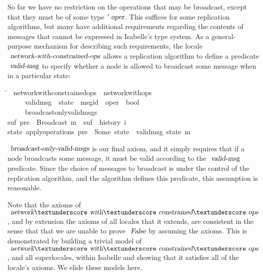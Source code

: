 So far we have no restriction on the operations that may be broadcast, except that they must be of some type $\isacharprime\isa{oper}$.
This suffices for some replication algorithms, but many have additional requirements regarding the contents of messages that cannot be expressed in Isabelle's type system.
As a general-purpose mechanism for describing such requirements, the locale $\isa{network-with-constrained-ops}$ allows a replication algorithm to define a predicate $\isa{valid-msg}$ to specify whether a node is allowed to broadcast some message when in a particular state:
\begin{isabelle}
\hspace{6em}\=\kill
{}\ network{\isacharunderscore}with{\isacharunderscore}constrained{\isacharunderscore}ops\ {\isacharequal}\ network{\isacharunderscore}with{\isacharunderscore}ops\ {\isacharplus}\\
~~~~\ valid{\isacharunderscore}msg\ {\isacharcolon}{\isacharcolon}\ {\isachardoublequoteopen}{\isacharprime}state\ {\isasymRightarrow}\ {\isacharparenleft}{\isacharprime}msgid\ {\isasymtimes}\ {\isacharprime}oper{\isacharparenright}\ {\isasymRightarrow}\ bool{\isachardoublequoteclose}\\
~~~~\ broadcast{\isacharunderscore}only{\isacharunderscore}valid{\isacharunderscore}msgs{\isacharcolon}\\
\>{\isachardoublequoteopen}{\isasymexists}suf{\isachardot}\ pre\ {\isacharat}\ {\isacharbrackleft}Broadcast\ m{\isacharbrackright}\ {\isacharat}\ suf\ {\isacharequal}\ history\ i\ {\isasymLongrightarrow}\\
\>{\isasymexists}state{\isachardot}\ apply{\isacharunderscore}operations\ pre\ {\isacharequal}\ Some\ state\ {\isasymand}\ valid{\isacharunderscore}msg\ state\ m{\isachardoublequoteclose}
\end{isabelle}

$\isa{broadcast-only-valid-msgs}$ is our final axiom, and it simply requires that if a node broadcasts some message, it must be valid according to the $\isa{valid-msg}$ predicate.
Since the choice of messages to broadcast is under the control of the replication algorithm, and the algorithm defines this predicate, this assumption is reasonable.

Note that the axioms of $\isa{network}{\isacharunderscore}\isa{with}{\isacharunderscore}\isa{constrained}{\isacharunderscore}\isa{ops}$, and by extension the axioms of all locales that it extends, are consistent in the sense that that we are unable to prove $\isa{False}$ by assuming the axioms.
This is demonstrated by building a trivial model of $\isa{network}{\isacharunderscore}\isa{with}{\isacharunderscore}\isa{constrained}{\isacharunderscore}\isa{ops}$, and all superlocales, within Isabelle and showing that it satisfies all of the locale's axioms.
We elide these models here.
